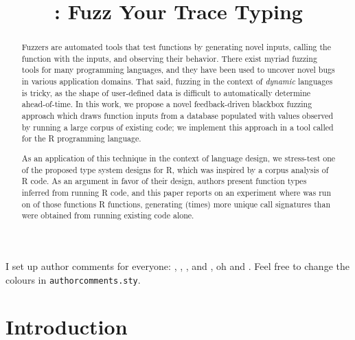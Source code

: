 \documentclass[sigplan,anonymous,review]{acmart}
\begin{document}
\title{\tool: Fuzz Your Trace Typing}

\begin{abstract}

Fuzzers are automated tools that test functions by generating novel inputs, calling the function with the inputs, and observing their behavior.
There exist myriad fuzzing tools for many programming languages, and they have been used to uncover novel bugs in various application domains.
That said, fuzzing in the context of \textit{dynamic} languages is tricky, as the shape of user-defined data is difficult to automatically determine ahead-of-time.
In this work, we propose a novel feedback-driven blackbox fuzzing approach which draws function inputs from a database populated with values observed by running a large corpus of existing code; we implement this approach in a tool called \tool for the R programming language.

As an application of this technique in the context of language design, we stress-test one of the proposed type system designs for R, which was inspired by a corpus analysis of R code.
As an argument in favor of their design, authors present function types inferred from running R code, and this paper reports on an experiment where \tool was run on \UFNumFunctions of those functions R functions, generating \UFSignatrAdditionalSignatures (\UFSignatrAdditionalSignaturesRatio times) more unique call signatures than were obtained from running existing code alone.

\end{abstract}

\maketitle

I set up author comments for everyone: , , , and , oh and . Feel free to change the
colours in {\tt authorcomments.sty}.

\section{Introduction}
\label{sec:introduction}
\end{document}
